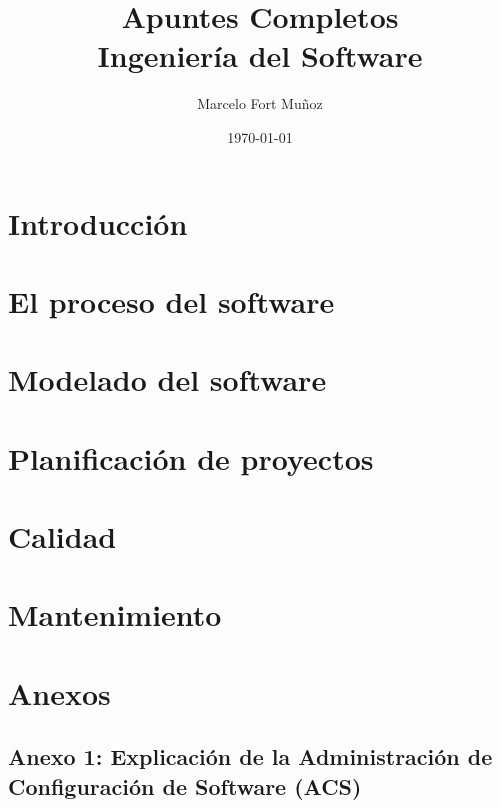 \documentclass[a4paper,11pt]{report}
\title{Apuntes Completos \\ \large Ingeniería del Software}
\author{Marcelo Fort Muñoz}
\date{\today}
\begin{document}
    \maketitle
    \tableofcontents
    \newpage


    \chapter{Introducción}\label{ch:introduccion}
    

    \chapter{El proceso del software}\label{ch:el-proceso-del-software}
    

    \chapter{Modelado del software}\label{ch:modelado-del-software}


    \chapter{Planificación de proyectos}\label{ch:planificacion-de-proyectos}
    

    \chapter{Calidad}\label{ch:calidad}
    

    \chapter{Mantenimiento}\label{ch:mantenimiento}
    

    \chapter*{Anexos}

    \clearpage


    \section*{Anexo 1: Explicación de la Administración de Configuración de Software (ACS)}
\end{document}
